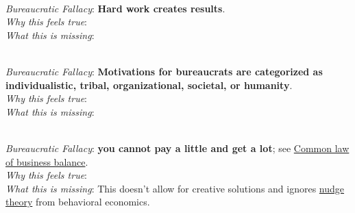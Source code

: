 \ \\

\textit{Bureaucratic Fallacy}: \textbf{Hard work creates results}.\\
\textit{Why this feels true}: \\
\textit{What this is missing}: 


\ \\

\textit{Bureaucratic Fallacy}: \textbf{Motivations for bureaucrats are categorized as individualistic, tribal, organizational, societal, or humanity}.\\
\textit{Why this feels true}: \\
\textit{What this is missing}: 


\ \\

\textit{Bureaucratic Fallacy}: \textbf{you cannot pay a little and get a lot}; see \href{https://en.wikipedia.org/wiki/Common_law_of_business_balance}{Common law of business balance}. \\
\textit{Why this feels true}: \\
\textit{What this is missing}: This doesn't allow for creative solutions and ignores \href{https://en.wikipedia.org/wiki/Nudge_theory}{nudge theory} from behavioral economics. 
